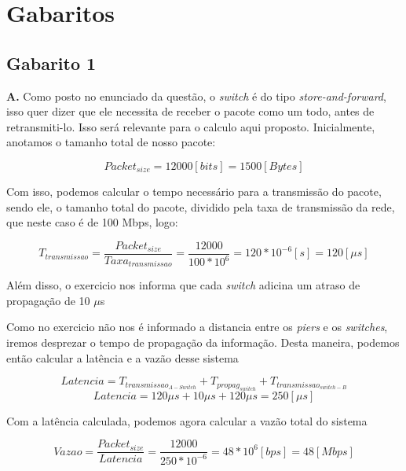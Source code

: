 \section{Gabaritos}\label{sec:gabaritos}
\subsection{Gabarito 1}
\textbf{A. } Como posto no enunciado da questão, o \textit{switch} é do tipo \textit{store-and-forward}, isso quer dizer que ele necessita de receber o pacote como um todo, antes de retransmiti-lo. Isso será relevante para o calculo aqui proposto.
Inicialmente, anotamos o tamanho total de nosso pacote:

\begin{equation}
	Packet_{size} = 12000 [bits] = 1500 [Bytes]
\end{equation}

Com isso, podemos calcular o tempo necessário para a transmissão do pacote, sendo ele, o tamanho total do pacote, dividido pela taxa de transmissão da rede, que neste caso é de 100 Mbps, logo:

\begin{equation}
	T_{transmissao} = \frac{Packet_{size}}{Taxa_{transmissao}} = \frac{12000}{100 * 10^6} = 120*10^{-6} [s] = 120 [\mu s]	
\end{equation}	

Além disso, o exercicio nos informa que cada \textit{switch} adicina um atraso de propagação de 10 $\mu$s 

Como no exercicio não nos é informado a distancia entre os \textit{piers} e os \textit{switches}, iremos desprezar o tempo de propagação da informação.
Desta maneira, podemos então calcular a latência e a vazão desse sistema

\begin{equation}
	Latencia = T_{transmissao_{A-Switch}} + T_{propag_{switch}} + T_{transmissao_{switch-B}}
\end{equation} 
\begin{equation}
	Latencia = 120\mu s + 10\mu s + 120\mu s = 250 [\mu s]
\end{equation}

Com a latência calculada, podemos agora calcular a vazão total do sistema

\begin{equation}
	Vazao = \frac{Packet_{size}}{Latencia} = \frac{12000}{250 * 10^{-6}} = 48 * 10^6 [bps] = 48 [Mbps]
\end{equation}

